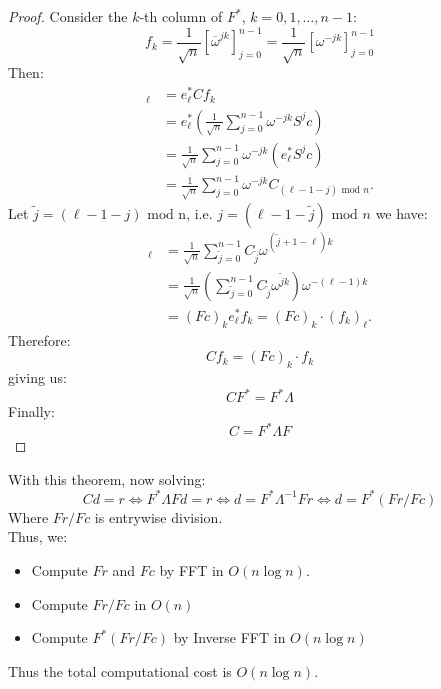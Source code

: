 \documentclass[../main/main.tex]{subfiles}
\begin{document}
\begin{proof}
  Consider the $k$-th column of $F^{*}$, $k=0,1, \ldots , n-1$: \[
f_{k} = \frac{1}{\sqrt{n}}[\overline{\omega} ^{j k}]_{j=0}^{n-1} = \frac{1}{\sqrt{n}} [\omega^{-j k}]_{j=0}^{n-1}
\] Then:
\begin{align*}
  [Cf_{k}]_{\ell }&= e_{\ell }^{*}Cf_{k}\\
                  &= e_{\ell }^{*}\left(\frac{1}{\sqrt{n}}\sum_{j=0}^{n-1}\omega ^{- j k} S^{j}c\right)\\
                  &=\frac{1}{\sqrt{n}}\sum_{j=0}^{n-1}\omega^{- j k}( e_{\ell }^{*}S^{j}c)\\
                  &=\frac{1}{\sqrt{n}}\sum_{j=0}^{n-1}\omega^{- j k}C_{(\ell -1-j)\text{ mod } n}
  .\end{align*}
Let $\tilde{j}=(\ell -1-j)\text{ mod  n}$, i.e. $j=(\ell-1-\tilde{j})\text{ mod }n$ we have: \begin{align*}
                                                      [Cf_{k}]_{\ell }&=\frac{1}{\sqrt{n}}\sum_{\tilde{j}=0}^{n-1}C_{\tilde{j}} \omega ^{(\tilde{j}+1-\ell)k}\\
                                                                                               &=\frac{1}{\sqrt{n}}\left(\sum_{\tilde{j}=0}^{n-1}C_{\tilde{j}}\omega ^{\tilde{j}k}\right)\omega ^{-(\ell-1)k}\\
                                                                                               &=(Fc)_{k}e^{*}_{\ell }f_{k} = (Fc)_{k}\cdot (f_{k})_{\ell }
                                                                                                 .\end{align*}
                                                                                               Therefore: \[
Cf_{k}=(Fc)_{k}\cdot f_{k}
\]
giving us: \[
CF^{*} = F^{*}\Lambda
\]
Finally: \[
  C = F^{*}\Lambda F
\]
\end{proof}
With this theorem, now solving: \[
Cd = r \iff  F^{*}\Lambda  F d = r \iff  d = F^{*}\Lambda ^{-1}F r \iff d = F^{*}(Fr / Fc)
\]
Where $Fr / Fc$ is entrywise division.\\

Thus, we:
\begin{itemize}
  \item Compute $Fr$ and $Fc$ by FFT in $O(n \log  n)$.
        \item Compute $Fr / Fc$ in $O(n)$
        \item Compute $F^{*}(Fr / Fc)$ by Inverse FFT in $O(n \log n)$
\end{itemize}
Thus the total computational cost is $O(n \log n)$.
\end{document}
